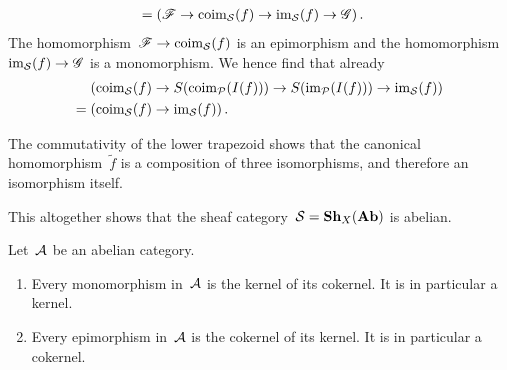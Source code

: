\begin{example}
\begin{enumerate}[resume]
\begin{itemize}
\begin{align*}
              ={}&  (
                          \mathscr{F}
                      \to \operatorname{coim}_{\mathcal{S}}(f)
                      \to \operatorname{im}_{\mathcal{S}}(f)
                      \to \mathscr{G}
                    ) \,.
          \end{align*}
          The homomorphism~$\mathscr{F} \to \operatorname{coim}_{\mathcal{S}}(f)$ is an epimorphism and the homomorphism~$\operatorname{im}_{\mathcal{S}}(f) \to \mathscr{G}$ is a monomorphism.
          We hence find that already
          \begin{align*}
            {}&
              (
                    \operatorname{coim}_{\mathcal{S}}(f)
                \to S(\operatorname{coim}_{\mathcal{P}}(I(f)))
                \to S(\operatorname{im}_{\mathcal{P}}(I(f)))
                \to \operatorname{im}_{\mathcal{S}}(f)
              )
            \\
            ={}&
              (
                    \operatorname{coim}_{\mathcal{S}}(f)
                \to \operatorname{im}_{\mathcal{S}}(f)
              ) \,.
          \end{align*}
      \end{itemize}
      The commutativity of the lower trapezoid shows that the canonical homomorphism~$\tilde{f}$ is a composition of three isomorphisms, and therefore an isomorphism itself.
  \end{enumerate}
  
  This altogether shows that the sheaf category~$\mathcal{S} = \mathbf{Sh}_X(\mathbf{Ab})$ is abelian.
\end{example}


\begin{lemma}
  Let~$\mathcal{A}$ be an abelian category.
  \begin{enumerate}
    \item
      Every monomorphism in~$\mathcal{A}$ is the kernel of its cokernel.
      It is in particular a kernel.
    \item
      Every epimorphism in~$\mathcal{A}$ is the cokernel of its kernel.
      It is in particular a cokernel.
  \end{enumerate}
\end{lemma}


